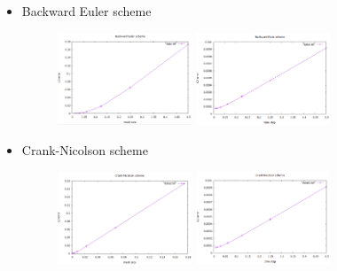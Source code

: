\begin{itemize}
	\item Backward Euler scheme
	\begin{figure}[ht]
		\centering
		\includegraphics[width=4cm]{BE} \quad
		\includegraphics[width=4cm]{BEt}
	\end{figure}
	\item Crank-Nicolson scheme
	\begin{figure}[ht]
		\centering
		\includegraphics[width=4cm]{CN} \quad
		\includegraphics[width=4cm]{CNt}
	\end{figure}
\end{itemize}

